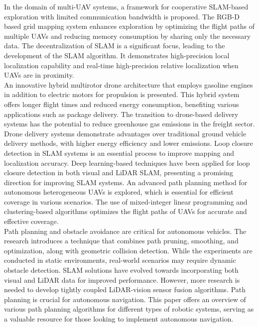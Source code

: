 \documentclass[preprint,12pt]{elsarticle}
\begin{document}
In the domain of multi-UAV systems, a framework for cooperative SLAM-based exploration with limited communication bandwidth is proposed. The RGB-D based grid mapping system enhances exploration by optimizing the flight paths of multiple UAVs and reducing memory consumption by sharing only the necessary data\cite{munguía2016vslam}. The decentralization of SLAM is a significant focus, leading to the development of the SLAM algorithm. It demonstrates high-precision local localization capability and real-time high-precision relative localization when UAVs are in proximity\cite{lópez2017sensorial}.\\
An innovative hybrid multirotor drone architecture that employs gasoline engines in addition to electric motors for propulsion is presented. This hybrid system offers longer flight times and reduced energy consumption, benefiting various applications such as package delivery\cite{stolaroff2018energy}. The transition to drone-based delivery systems has the potential to reduce greenhouse gas emissions in the freight sector. Drone delivery systems demonstrate advantages over traditional ground vehicle delivery methods, with higher energy efficiency and lower emissions\cite{jarrah2022flight}.
Loop closure detection in SLAM systems is an essential process to improve mapping and localization accuracy. Deep learning-based techniques have been applied for loop closure detection in both visual and LiDAR SLAM, presenting a promising direction for improving SLAM systems\cite{arshad2021loop}. An advanced path planning method for autonomous heterogeneous UAVs is explored, which is essential for efficient coverage in various scenarios. The use of mixed-integer linear programming and clustering-based algorithms optimizes the flight paths of UAVs for accurate and effective coverage\cite{chen2022coverage}.\\
Path planning and obstacle avoidance are critical for autonomous vehicles. The research introduces a technique that combines path pruning, smoothing, and optimization, along with geometric collision detection. While the experiments are conducted in static environments, real-world scenarios may require dynamic obstacle detection\cite{yang2021rrt}. SLAM solutions have evolved towards incorporating both visual and LiDAR data for improved performance. However, more research is needed to develop tightly coupled LiDAR-vision sensor fusion algorithms\cite{debeunne2020vlidar}. Path planning is crucial for autonomous navigation. This paper offers an overview of various path planning algorithms for different types of robotic systems, serving as a valuable resource for those looking to implement autonomous navigation\cite{karur2021path}.\\
\end{document}
